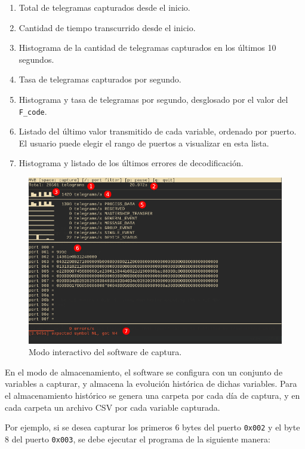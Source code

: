 \begin{enumerate}
\item Total de telegramas capturados desde el inicio.
\item Cantidad de tiempo transcurrido desde el inicio.
\item Histograma de la cantidad de telegramas capturados en los últimos 10 segundos.
\item Tasa de telegramas capturados por segundo.
\item Histograma y tasa de telegramas por segundo, desglosado por el valor del \texttt{F\_code}.
\item Listado del último valor transmitido de cada variable, ordenado por puerto. El usuario puede elegir el rango de puertos a visualizar en esta lista.
\item Histograma y listado de los últimos errores de decodificación.
\end{enumerate}

\begin{figure}[htbp]
	\centering
	\includegraphics[width=1\textwidth]{./Figures/modo-interactivo.pdf}
	\caption{Modo interactivo del software de captura.}
    \label{fig:interactivo}
\end{figure}

En el modo de almacenamiento, el software se configura con un conjunto de variables a capturar, y almacena la evolución histórica de dichas variables.
Para el almacenamiento histórico se genera una carpeta por cada día de captura, y en cada carpeta un archivo CSV por cada variable capturada.

Por ejemplo, si se desea capturar los primeros 6 bytes del puerto \texttt{0x002} y el byte 8 del puerto \texttt{0x003}, se debe ejecutar el programa de la siguiente manera:


